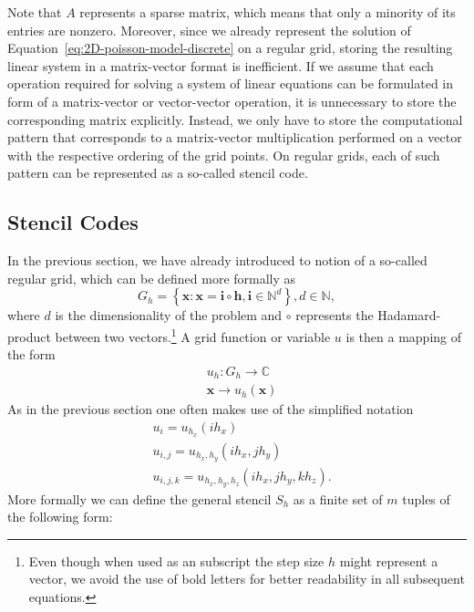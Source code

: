 Note that $A$ represents a sparse matrix, which means that only a minority of its entries are nonzero.
Moreover, since we already represent the solution of Equation~\ref{eq:2D-poisson-model-discrete} on a regular grid, storing the resulting linear system in a matrix-vector format is inefficient.
If we assume that each operation required for solving a system of linear equations can be formulated in form of a matrix-vector or vector-vector operation, it is unnecessary to store the corresponding matrix explicitly.
Instead, we only have to store the computational pattern that corresponds to a matrix-vector multiplication performed on a vector with the respective ordering of the grid points.
On regular grids, each of such pattern can be represented as a so-called stencil code.
\subsection{Stencil Codes}
\label{subsec:stencil-codes}
In the previous section, we have already introduced to notion of a so-called regular grid, which can be defined more formally as
\begin{equation}
	G_{h} = \left\{ \bm{x} : \bm{x} = \bm{i} \circ \bm{h}, \bm{i} \in \mathbb{N}^d \right\}, d \in \mathbb{N},
\end{equation}
where $d$ is the dimensionality of the problem and $\circ$ represents the Hadamard-product between two vectors.\footnote{Even though when used as an subscript the step size $h$ might represent a vector, we avoid the use of bold letters for better readability in all subsequent equations.}
A grid function or variable $u$ is then a mapping of the form
\begin{equation}
	\begin{split}
		& u_h : G_{h}\to \mathbb{C} \\
		& \bm{x} \to u_h(\bm{x})
	\end{split}
\end{equation}
As in the previous section one often makes use of the simplified notation
\begin{equation}
	\begin{split}
		 & u_i = u_{h_x}(i h_x) \\
		& u_{i,j} = u_{h_x, h_y}(i h_x, j h_y) \\
		& u_{i,j,k} = u_{h_x, h_y, h_z}(i h_x, j h_y, k h_z).
	\end{split}
\end{equation}
More formally we can define the general stencil $S_h$ as a finite set of $m$ tuples of the following form:

